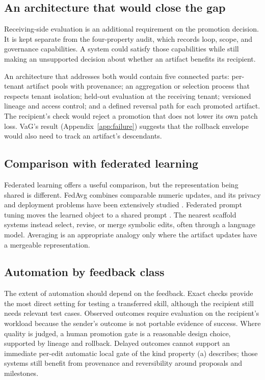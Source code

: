 \subsection{An architecture that would close the gap}\label{an-architecture-that-would-close-the-gap}

Receiving-side evaluation is an additional requirement on the promotion decision. It is kept separate from the four-property audit, which records loop, scope, and governance capabilities. A system could satisfy those capabilities while still making an unsupported decision about whether an artifact benefits its recipient.

An architecture that addresses both would contain five connected parts: per-tenant artifact pools with provenance; an aggregation or selection process that respects tenant isolation; held-out evaluation at the receiving tenant; versioned lineage and access control; and a defined reversal path for each promoted artifact. The recipient's check would reject a promotion that does not lower its own patch loss. VaG's result (Appendix~\ref{app:failure}) suggests that the rollback envelope would also need to track an artifact's descendants.

\subsection{Comparison with federated learning}\label{comparison-with-federated-learning}

Federated learning offers a useful comparison, but the representation being shared is different. FedAvg combines comparable numeric updates, and its privacy and deployment problems have been extensively studied \citep{mcmahan2017fedavg, mcmahan2018dpfedavg, kairouz2021federated}. Federated prompt tuning moves the learned object to a shared prompt \citep{guo2022promptfl}. The nearest scaffold systems instead select, revise, or merge symbolic edits, often through a language model. Averaging is an appropriate analogy only where the artifact updates have a mergeable representation.

\subsection{Automation by feedback class}\label{automation-by-feedback-class}

The extent of automation should depend on the feedback. Exact checks provide the most direct setting for testing a transferred skill, although the recipient still needs relevant test cases. Observed outcomes require evaluation on the recipient's workload because the sender's outcome is not portable evidence of success. Where quality is judged, a human promotion gate is a reasonable design choice, supported by lineage and rollback. Delayed outcomes cannot support an immediate per-edit automatic local gate of the kind property (a) describes; those systems still benefit from provenance and reversibility around proposals and milestones.

